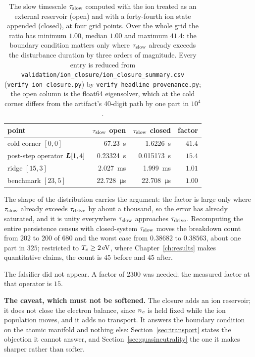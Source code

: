 \begin{table}[tbp]
  \centering
  \caption[Effect of closing the ion boundary on the slow timescale]{The slow
  timescale $\tau_{\mathrm{slow}}$ computed with the ion treated as an external reservoir
  (open) and with a forty-fourth ion state appended (closed), at four grid
  points. Over the whole grid the ratio has minimum $1.00$, median $1.00$ and
  maximum $41.4$: the boundary condition matters only where $\tau_{\mathrm{slow}}$ already
  exceeds the disturbance duration by three orders of magnitude. Every entry is
  reduced from \texttt{validation/ion\_closure/ion\_closure\_summary.csv}
  (\texttt{verify\_ion\_closure.py}) by
  \texttt{verify\_headline\_provenance.py}; the open column is the float64
  eigensolver, which at the cold corner differs from the artifact's 40-digit
  path by one part in $10^{4}$.}
  \label{tab:closure}
  \begin{tabular}{lrrr}
    \toprule
    point & $\tau_{\mathrm{slow}}$ open & $\tau_{\mathrm{slow}}$ closed & factor \\
    \midrule
    cold corner $[0,0]$ & \SI{67.23}{\second} & \SI{1.6226}{\second} & $41.4$ \\
    post-step operator $\bm{L}[1,4]$ & \SI{0.23324}{\second} & \SI{0.015173}{\second} & $15.4$ \\
    ridge $[15,3]$ & \SI{2.027}{\milli\second} & \SI{1.999}{\milli\second} & $1.01$ \\
    benchmark $[23,5]$ & \SI{22.728}{\micro\second} & \SI{22.708}{\micro\second} & $1.00$ \\
    \bottomrule
  \end{tabular}
\end{table}

The shape of the distribution carries the argument: the factor is large only
where $\tau_{\mathrm{slow}}$ already exceeds $\tau_{\mathrm{drive}}$ by about a thousand, so the error
has already saturated, and it is unity everywhere $\tau_{\mathrm{slow}}$ approaches
$\tau_{\mathrm{drive}}$. Recomputing the entire persistence census with closed-system
$\tau_{\mathrm{slow}}$ moves the breakdown count from $202$ to $200$ of $680$ and the worst
case from $0.38682$ to $0.38563$, about one part in $325$; restricted to
$T_e \ge \SI{2}{\electronvolt}$, where Chapter~\ref{ch:results} makes
quantitative claims, the count is $45$ before and $45$ after.

The falsifier did not appear. A factor of $2300$ was needed; the measured factor
at that operator is $15$.

\textbf{The caveat, which must not be softened.} The closure adds an ion
reservoir; it does not close the electron balance, since $n_e$ is held fixed
while the ion population moves, and it adds no transport. It answers the
boundary condition on the atomic manifold and nothing else:
Section~\ref{sec:transport} states the objection it cannot answer, and
Section~\ref{sec:quasineutrality} the one it makes sharper rather than softer.

